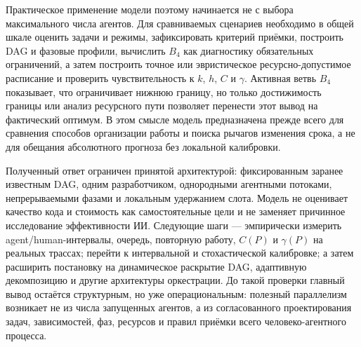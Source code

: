 Практическое применение модели поэтому начинается не с выбора максимального
числа агентов. Для сравниваемых сценариев необходимо в общей шкале оценить
задачи и режимы, зафиксировать критерий приёмки, построить DAG и фазовые
профили, вычислить $B_4$ как диагностику обязательных ограничений, а затем
построить точное или эвристическое ресурсно-допустимое расписание и проверить
чувствительность к $k$, $h$, $C$ и $\gamma$. Активная ветвь $B_4$ показывает,
что ограничивает нижнюю границу, но только достижимость границы или анализ
ресурсного пути позволяет перенести этот вывод на фактический оптимум. В этом
смысле модель предназначена прежде всего для сравнения способов организации
работы и поиска рычагов изменения срока, а не для обещания абсолютного прогноза
без локальной калибровки.

Полученный ответ ограничен принятой архитектурой: фиксированным заранее
известным DAG, одним разработчиком, однородными агентными потоками,
непрерываемыми фазами и локальным удержанием слота. Модель не оценивает качество
кода и стоимость как самостоятельные цели и не заменяет причинное исследование
эффективности ИИ. Следующие шаги --- эмпирически измерить agent/human-интервалы,
очередь, повторную работу, $C(P)$ и $\gamma(P)$ на реальных трассах; перейти к
интервальной и стохастической калибровке; а затем расширить постановку на
динамическое раскрытие DAG, адаптивную декомпозицию и другие архитектуры
оркестрации. До такой проверки главный вывод остаётся структурным, но уже
операциональным: полезный параллелизм возникает не из числа запущенных агентов,
а из согласованного проектирования задач, зависимостей, фаз, ресурсов и правил
приёмки всего человеко-агентного процесса.
